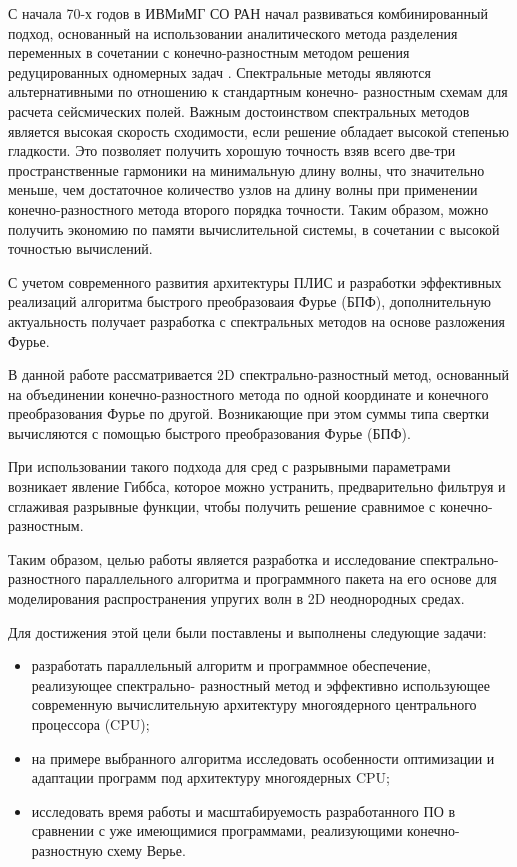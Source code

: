 С начала 70-х годов в ИВМиМГ СО РАН начал развиваться комбинированный подход, основанный на использовании аналитического метода разделения переменных в сочетании с конечно-разностным методом решения редуцированных одномерных задач \cite{alex}. Спектральные методы являются альтернативными по отношению к стандартным конечно-
разностным схемам для расчета сейсмических полей. Важным достоинством
спектральных методов является высокая скорость сходимости, если решение обладает
высокой степенью гладкости. Это позволяет получить хорошую точность взяв всего две-три
пространственные гармоники на минимальную длину волны, что значительно меньше, 
чем достаточное количество узлов на длину волны при применении конечно-разностного метода второго порядка точности.
Таким образом, можно получить экономию по памяти вычислительной системы, в сочетании с высокой точностью вычислений.

С учетом современного развития архитектуры ПЛИС и разработки эффективных реализаций алгоритма быстрого преобразоваия Фурье (БПФ), дополнительную актуальность получает разработка с спектральных методов на основе разложения Фурье.

В данной работе рассматривается 2D спектрально-разностный метод, основанный на
объединении конечно-разностного метода по одной координате и конечного
преобразования Фурье по другой. Возникающие при этом суммы
типа свертки вычисляются с помощью быстрого преобразования Фурье (БПФ).

При использовании такого подхода для сред с разрывными параметрами возникает явление Гиббса,
которое можно устранить, предварительно фильтруя и сглаживая разрывные функции,
чтобы получить решение сравнимое с конечно-разностным.

Таким образом, целью работы является разработка  и исследование спектрально-разностного
параллельного алгоритма и программного пакета на его основе для моделирования распространения
упругих волн в 2D неоднородных средах.

Для достижения этой цели были поставлены и выполнены следующие задачи:
\begin{itemize}
    \item разработать параллельный алгоритм и программное обеспечение, реализующее спектрально-
разностный метод и эффективно использующее современную вычислительную
архитектуру многоядерного центрального процессора (CPU);
    \item на примере выбранного алгоритма исследовать особенности оптимизации и адаптации программ под архитектуру многоядерных CPU;
    \item исследовать время работы и масштабируемость разработанного ПО в
сравнении с уже имеющимися программами, реализующими конечно-разностную схему
Верье.
\end{itemize}

